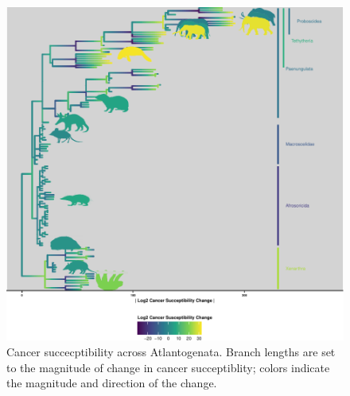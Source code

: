 \documentclass[]{elsarticle} %
\begin{document}
\begin{figure}

\includegraphics[width=6in]{paper_PLOS_draft_files/figure-latex/Figure-CancerSuscept-1} \hfill{}

\caption{Cancer succecptibility across Atlantogenata. Branch lengths are set to the magnitude of change in cancer succeptiblity; colors indicate the magnitude and direction of the change.}\label{fig:Figure-CancerSuscept}
\end{figure}
\end{document}

